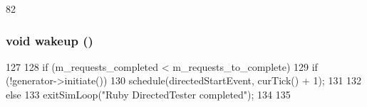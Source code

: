 \begin{DoxyCode}
82 {}
\end{DoxyCode}
\hypertarget{classRubyDirectedTester_ae674290a26ecbd622c5160e38e8a4fe9}{
\subsubsection[{wakeup}]{\setlength{\rightskip}{0pt plus 5cm}void wakeup ()}}
\label{classRubyDirectedTester_ae674290a26ecbd622c5160e38e8a4fe9}



\begin{DoxyCode}
127 {
128     if (m_requests_completed < m_requests_to_complete) {
129         if (!generator->initiate()) {
130             schedule(directedStartEvent, curTick() + 1);
131         }
132     } else {
133         exitSimLoop("Ruby DirectedTester completed");
134     }
135 }
\end{DoxyCode}


